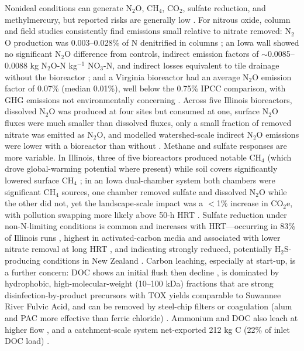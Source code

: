 \documentclass[11pt]{article}
\begin{document}
Nonideal conditions can generate N$_2$O, CH$_4$, CO$_2$, sulfate reduction, and methylmercury, but reported risks are generally low \parencite{Hartfiel2022}. For nitrous oxide, column and field studies consistently find emissions small relative to nitrate removed: N$_2$O production was 0.003--0.028\% of N denitrified in columns \parencite{Greenan2009}; an Iowa wall showed no significant N$_2$O difference from controls, indirect emission factors of $\sim$0.0085--0.0088 kg N$_2$O-N kg$^{-1}$ NO$_3$-N, and indirect losses equivalent to tile drainage without the bioreactor \parencite{Moorman2010}; and a Virginia bioreactor had an average N$_2$O emission factor of 0.07\% (median 0.01\%), well below the 0.75\% IPCC comparison, with GHG emissions not environmentally concerning \parencite{Bock2018}. Across five Illinois bioreactors, dissolved N$_2$O was produced at four sites but consumed at one, surface N$_2$O fluxes were much smaller than dissolved fluxes, only a small fraction of removed nitrate was emitted as N$_2$O, and modelled watershed-scale indirect N$_2$O emissions were lower with a bioreactor than without \parencite{Brunton2024}. Methane and sulfate responses are more variable. In Illinois, three of five bioreactors produced notable CH$_4$ (which drove global-warming potential where present) while soil covers significantly lowered surface CH$_4$ \parencite{Brunton2024}; in an Iowa dual-chamber system both chambers were significant CH$_4$ sources, one chamber removed sulfate and dissolved N$_2$O while the other did not, yet the landscape-scale impact was a $<$1\% increase in CO$_2$e, with pollution swapping more likely above 50-h HRT \parencite{Hartfiel2023b}. Sulfate reduction under non-N-limiting conditions is common and increases with HRT---occurring in 83\% of Illinois runs \parencite{Bell2015}, highest in activated-carbon media and associated with lower nitrate removal at long HRT \parencite{Povilaitis2020}, and indicating strongly reduced, potentially H$_2$S-producing conditions in New Zealand \parencite{Rivas2020}. Carbon leaching, especially at start-up, is a further concern: DOC shows an initial flush then decline \parencite{Abusallout2017,Rivas2020}, is dominated by hydrophobic, high-molecular-weight (10--100 kDa) fractions that are strong disinfection-by-product precursors with TOX yields comparable to Suwannee River Fulvic Acid, and can be removed by steel-chip filters or coagulation (alum and PAC more effective than ferric chloride) \parencite{Abusallout2017}. Ammonium and DOC also leach at higher flow \parencite{Greenan2009}, and a catchment-scale system net-exported 212 kg C (22\% of inlet DOC load) \parencite{Feyereisen2023}.
\end{document}
